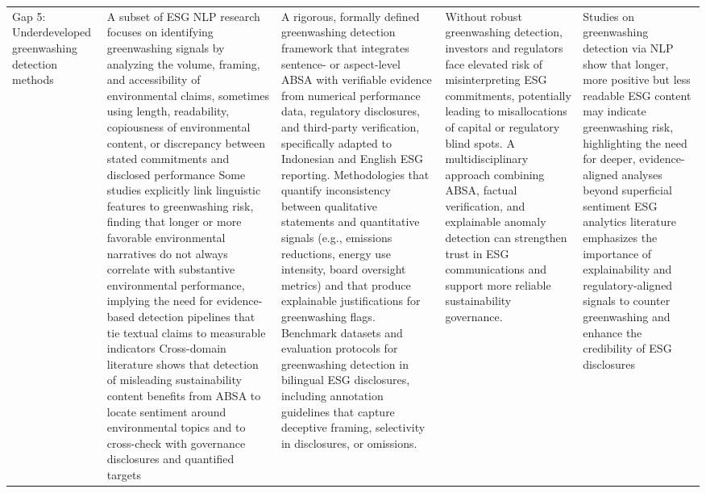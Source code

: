 \begin{landscape}
\begin{longtable}{p{2cm} p{8cm} p{7cm} p{4cm} p{4cm}}
\addlinespace
Gap 5: Underdeveloped greenwashing detection methods & A subset of ESG NLP research focuses on identifying greenwashing signals by analyzing the volume, framing, and accessibility of environmental claims, sometimes using length, readability, copiousness of environmental content, or discrepancy between stated commitments and disclosed performance \cite{10.1111/eufm.12509,10.3389/frai.2025.1616007,10.3897/rio.6.e57602} Some studies explicitly link linguistic features to greenwashing risk, finding that longer or more favorable environmental narratives do not always correlate with substantive environmental performance, implying the need for evidence-based detection pipelines that tie textual claims to measurable indicators \cite{10.1111/eufm.12509} Cross-domain literature shows that detection of misleading sustainability content benefits from ABSA to locate sentiment around environmental topics and to cross-check with governance disclosures and quantified targets \cite{10.1111/eufm.12509,10.69593/ajbais.v4i04.130} & A rigorous, formally defined greenwashing detection framework that integrates sentence- or aspect-level ABSA with verifiable evidence from numerical performance data, regulatory disclosures, and third-party verification, specifically adapted to Indonesian and English ESG reporting. Methodologies that quantify inconsistency between qualitative statements and quantitative signals (e.g., emissions reductions, energy use intensity, board oversight metrics) and that produce explainable justifications for greenwashing flags. Benchmark datasets and evaluation protocols for greenwashing detection in bilingual ESG disclosures, including annotation guidelines that capture deceptive framing, selectivity in disclosures, or omissions. & Without robust greenwashing detection, investors and regulators face elevated risk of misinterpreting ESG commitments, potentially leading to misallocations of capital or regulatory blind spots. A multidisciplinary approach combining ABSA, factual verification, and explainable anomaly detection can strengthen trust in ESG communications and support more reliable sustainability governance. & Studies on greenwashing detection via NLP show that longer, more positive but less readable ESG content may indicate greenwashing risk, highlighting the need for deeper, evidence-aligned analyses beyond superficial sentiment \cite{10.1111/eufm.12509} ESG analytics literature emphasizes the importance of explainability and regulatory-aligned signals to counter greenwashing and enhance the credibility of ESG disclosures \cite{10.1002/csr.70089,10.2139/ssrn.3738629,10.1108/mf-01-2023-0020} \\


\end{longtable}

\end{landscape}
